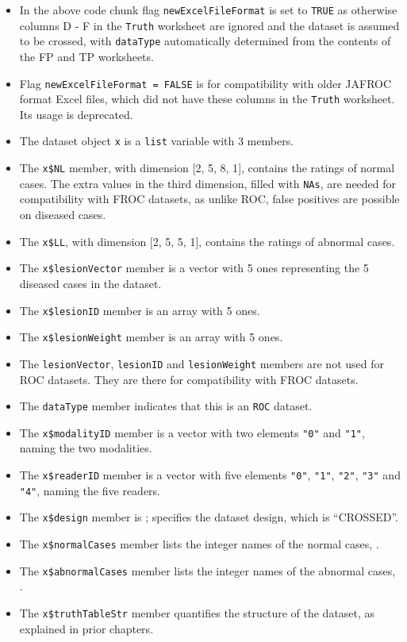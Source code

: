 \documentclass[
]{book}
\providecommand{\tightlist}{%
  \setlength{\itemsep}{0pt}\setlength{\parskip}{0pt}}
\begin{document}
\begin{itemize}
\tightlist
\item
  In the above code chunk flag \texttt{newExcelFileFormat} is set to \texttt{TRUE} as otherwise columns D - F in the \texttt{Truth} worksheet are ignored and the dataset is assumed to be crossed, with \texttt{dataType} automatically determined from the contents of the FP and TP worksheets.
\item
  Flag \texttt{newExcelFileFormat\ =\ FALSE} is for compatibility with older JAFROC format Excel files, which did not have these columns in the \texttt{Truth} worksheet. Its usage is deprecated.
\item
  The dataset object \texttt{x} is a \texttt{list} variable with 3 members.
\item
  The \texttt{x\$NL} member, with dimension {[}2, 5, 8, 1{]}, contains the ratings of normal cases. The extra values in the third dimension, filled with \texttt{NAs}, are needed for compatibility with FROC datasets, as unlike ROC, false positives are possible on diseased cases.
\item
  The \texttt{x\$LL}, with dimension {[}2, 5, 5, 1{]}, contains the ratings of abnormal cases.
\item
  The \texttt{x\$lesionVector} member is a vector with 5 ones representing the 5 diseased cases in the dataset.
\item
  The \texttt{x\$lesionID} member is an array with 5 ones.
\item
  The \texttt{x\$lesionWeight} member is an array with 5 ones.
\item
  The \texttt{lesionVector}, \texttt{lesionID} and \texttt{lesionWeight} members are not used for ROC datasets. They are there for compatibility with FROC datasets.
\item
  The \texttt{dataType} member indicates that this is an \texttt{ROC} dataset.
\item
  The \texttt{x\$modalityID} member is a vector with two elements \texttt{"0"} and \texttt{"1"}, naming the two modalities.
\item
  The \texttt{x\$readerID} member is a vector with five elements \texttt{"0"}, \texttt{"1"}, \texttt{"2"}, \texttt{"3"} and \texttt{"4"}, naming the five readers.
\item
  The \texttt{x\$design} member is ; specifies the dataset design, which is ``CROSSED''.
\item
  The \texttt{x\$normalCases} member lists the integer names of the normal cases, .
\item
  The \texttt{x\$abnormalCases} member lists the integer names of the abnormal cases, .
\item
  The \texttt{x\$truthTableStr} member quantifies the structure of the dataset, as explained in prior chapters.
\end{itemize}
\end{document}
